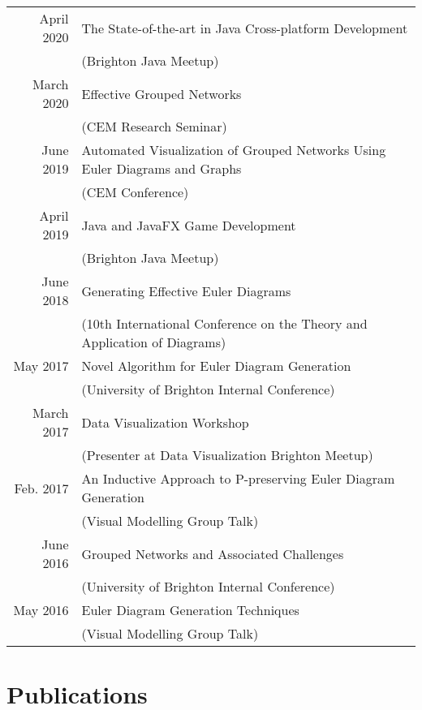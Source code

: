 \documentclass[a4paper,11pt]{article} %
\begin{document}
\begin{center}
\begin{tabular}{rl}

April 2020 & The State-of-the-art in Java Cross-platform Development\\ & (Brighton Java Meetup) \\

March 2020 & Effective Grouped Networks\\ & (CEM Research Seminar) \\

June 2019 & Automated Visualization of Grouped Networks Using Euler Diagrams and Graphs\\ & (CEM Conference) \\

April 2019 & Java and JavaFX Game Development\\ & (Brighton Java Meetup) \\

June 2018 & Generating Effective Euler Diagrams\\ & (10th International Conference on the Theory and Application of Diagrams) \\

May 2017 & Novel Algorithm for Euler Diagram Generation\\ & (University of Brighton Internal Conference) \\

March 2017 & Data Visualization Workshop\\ & (Presenter at Data Visualization Brighton Meetup) \\

Feb. 2017 & An Inductive Approach to P-preserving Euler Diagram Generation\\ & (Visual Modelling Group Talk) \\

June 2016 & Grouped Networks and Associated Challenges\\ & (University of Brighton Internal Conference) \\

May 2016 & Euler Diagram Generation Techniques\\ & (Visual Modelling Group Talk) \\

\end{tabular}
\end{center}



\section{Publications}
\end{document}
